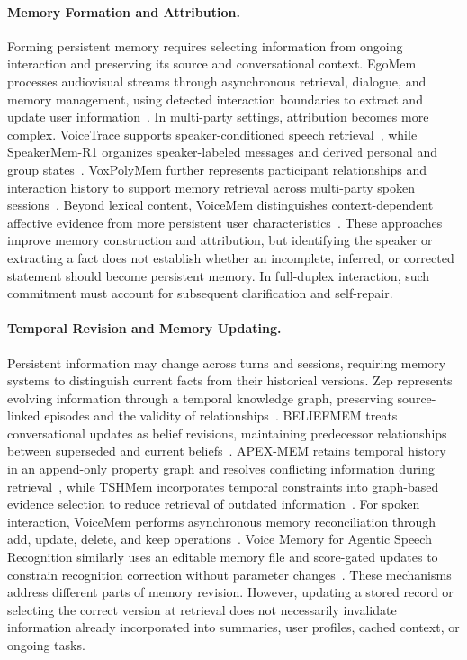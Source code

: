 \paragraph{Memory Formation and Attribution.}
Forming persistent memory requires selecting information from ongoing interaction and preserving its source and conversational context. EgoMem processes audiovisual streams through asynchronous retrieval, dialogue, and memory management, using detected interaction boundaries to extract and update user information~\citep{DBLP:journals/corr/abs-2509-11914}. In multi-party settings, attribution becomes more complex. VoiceTrace supports speaker-conditioned speech retrieval~\citep{DBLP:journals/corr/abs-2609-18521}, while SpeakerMem-R1 organizes speaker-labeled messages and derived personal and group states~\citep{DBLP:journals/corr/abs-2609-26780}. VoxPolyMem further represents participant relationships and interaction history to support memory retrieval across multi-party spoken sessions~\citep{DBLP:journals/corr/abs-2609-32522}. Beyond lexical content, VoiceMem distinguishes context-dependent affective evidence from more persistent user characteristics~\citep{DBLP:journals/corr/abs-2608-26005}. These approaches improve memory construction and attribution, but identifying the speaker or extracting a fact does not establish whether an incomplete, inferred, or corrected statement should become persistent memory. In full-duplex interaction, such commitment must account for subsequent clarification and self-repair.

\paragraph{Temporal Revision and Memory Updating.}
Persistent information may change across turns and sessions, requiring memory systems to distinguish current facts from their historical versions. Zep represents evolving information through a temporal knowledge graph, preserving source-linked episodes and the validity of relationships~\citep{DBLP:journals/corr/abs-2501-13956}. BELIEFMEM treats conversational updates as belief revisions, maintaining predecessor relationships between superseded and current beliefs~\citep{meng-etal-2026-beliefmem}. APEX-MEM retains temporal history in an append-only property graph and resolves conflicting information during retrieval~\citep{DBLP:conf/acl/BanerjeeMSMC26}, while TSHMem incorporates temporal constraints into graph-based evidence selection to reduce retrieval of outdated information~\citep{xu-etal-2026-tshmem}. For spoken interaction, VoiceMem performs asynchronous memory reconciliation through add, update, delete, and keep operations~\citep{DBLP:journals/corr/abs-2608-26005}. Voice Memory for Agentic Speech Recognition similarly uses an editable memory file and score-gated updates to constrain recognition correction without parameter changes~\citep{DBLP:journals/corr/abs-2607-26410}. These mechanisms address different parts of memory revision. However, updating a stored record or selecting the correct version at retrieval does not necessarily invalidate information already incorporated into summaries, user profiles, cached context, or ongoing tasks.

